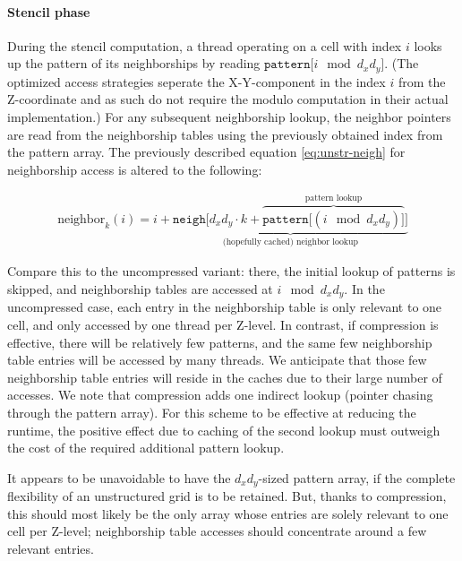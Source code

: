 \paragraph{Stencil phase}

During the stencil computation, a thread operating on a cell with index $i$ looks up the pattern of its neighborships by reading $\mathtt{pattern[}i \mod d_xd_y\mathtt{]}$. (The optimized access strategies seperate the X-Y-component in the index $i$ from the Z-coordinate and as such do not require the modulo computation in their actual implementation.) For any subsequent neighborship lookup, the neighbor pointers are read from the neighborship tables using the previously obtained index from the pattern array. The previously described equation \ref{eq:unstr-neigh} for neighborship access is altered to the following:

\begin{gather}
	\text{neighbor}_k(i) = i + \underbrace{\mathtt{neigh[}d_xd_y\cdot k + \overbrace{\mathtt{pattern[}(i \mod d_xd_y)\mathtt{]}}^\text{pattern lookup}\mathtt{]}}_\text{(hopefully cached) neighbor lookup} \label{eq:unstr-neigh-comp}
\end{gather}

Compare this to the uncompressed variant: there, the initial lookup of patterns is skipped, and neighborship tables are accessed at $i\mod d_xd_y$. In the uncompressed case, each entry in the neighborship table is only relevant to one cell, and only accessed by one thread per Z-level. In contrast, if compression is effective, there will be relatively few patterns, and the same few neighborship table entries will be accessed by many threads. We anticipate that those few neighborship table entries will reside in the caches due to their large number of accesses. We note that compression adds one indirect lookup (pointer chasing through the pattern array). For this scheme to be effective at reducing the runtime, the positive effect due to caching of the second lookup must outweigh the cost of the required additional pattern lookup.

It appears to be unavoidable to have the $d_xd_y$-sized pattern array, if the complete flexibility of an unstructured grid is to be retained. But, thanks to compression, this should most likely be the only array whose entries are solely relevant to one cell per Z-level; neighborship table accesses should concentrate around a few relevant entries.

